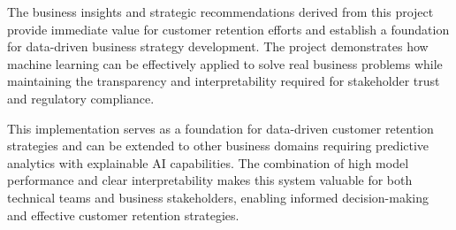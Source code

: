 \documentclass{article}
\begin{document}
The business insights and strategic recommendations derived from this project provide immediate value for customer retention efforts and establish a foundation for data-driven business strategy development. The project demonstrates how machine learning can be effectively applied to solve real business problems while maintaining the transparency and interpretability required for stakeholder trust and regulatory compliance.

This implementation serves as a foundation for data-driven customer retention strategies and can be extended to other business domains requiring predictive analytics with explainable AI capabilities. The combination of high model performance and clear interpretability makes this system valuable for both technical teams and business stakeholders, enabling informed decision-making and effective customer retention strategies.
\end{document}
